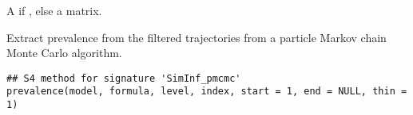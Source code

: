 \documentclass[letterpaper]{book}
\begin{document}
%
\begin{Value}
A  if , else
a matrix.
\end{Value}
%
\begin{Description}
Extract prevalence from the filtered trajectories from a particle
Markov chain Monte Carlo algorithm.
\end{Description}
%
\begin{Usage}
\begin{verbatim}
## S4 method for signature 'SimInf_pmcmc'
prevalence(model, formula, level, index, start = 1, end = NULL, thin = 1)
\end{verbatim}
\end{Usage}
%
\end{document}
